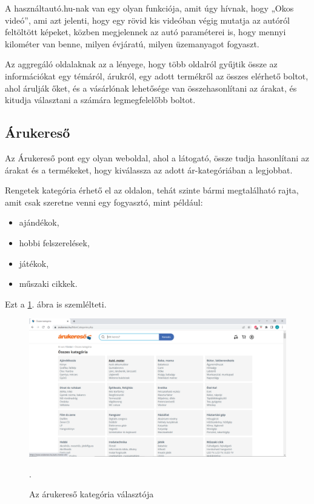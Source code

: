 A használtautó.hu-nak van egy olyan funkciója, amit úgy hívnak, hogy „Okos videó”, ami azt jelenti, hogy egy rövid kis videóban végig mutatja az autóról feltöltött képeket, közben megjelennek az autó paraméterei is, hogy mennyi kilométer van benne, milyen évjáratú, milyen üzemanyagot fogyaszt. 


Az aggregáló oldalaknak az a lényege, hogy több oldalról gyűjtik össze az információkat egy témáról, árukról, egy adott termékről az összes elérhető boltot, ahol árulják őket, és a vásárlónak lehetősége van összehasonlítani az árakat, és kitudja választani a számára legmegfelelőbb boltot.

\subsection{Árukereső}

Az Árukereső pont egy olyan weboldal, ahol a látogató, össze tudja hasonlítani az árakat és a termékeket, hogy kiválassza az adott ár-kategóriában a legjobbat.

Rengetek kategória érhető el az oldalon, tehát szinte bármi megtalálható rajta, amit csak szeretne venni egy fogyasztó, mint például:

\begin{itemize}
\item ajándékok,
\item hobbi felszerelések,
\item játékok,
\item műszaki cikkek.
\end{itemize} Ezt a \ref{fig:arukereso}. ábra is szemlélteti.

\begin{figure}[h]
\centering
\includegraphics[scale=0.8]{images/arukereso.png}
\caption{Az árukereső kategória választója \cite{Arukereso}}.
\label{fig:arukereso}
\end{figure}
\newpage